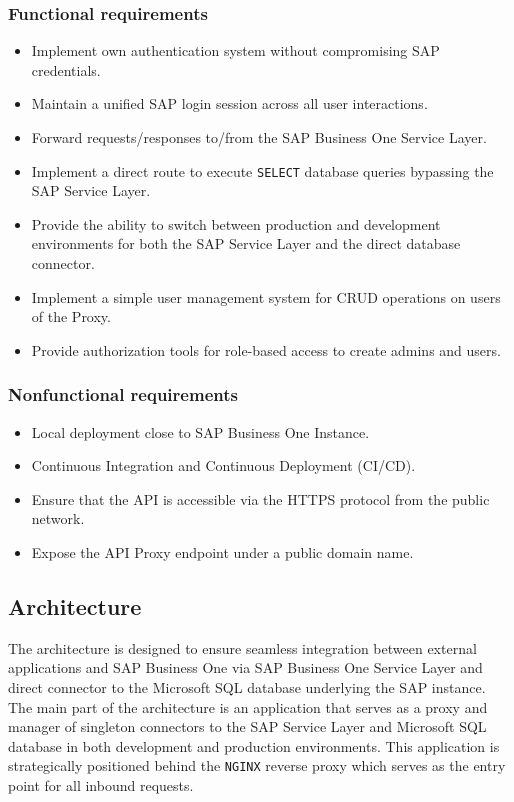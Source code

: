 \subsubsection{Functional requirements}
\label{subsubs:functional-requirements}
\begin{itemize}
    \item Implement own authentication system without compromising SAP credentials.
    \item Maintain a unified SAP login session across all user interactions.
    \item Forward requests/responses to/from the SAP Business One Service Layer.
    \item Implement a direct route to execute \texttt{SELECT} database queries bypassing the SAP Service Layer.
    \item Provide the ability to switch between production and development environments for both the SAP Service Layer and the direct database connector.
    \item Implement a simple user management system for CRUD operations on users of the Proxy.
    \item Provide authorization tools for role-based access to create admins and users.
\end{itemize}

\subsubsection{Nonfunctional requirements}
\label{subsubsec:nonfunctional-requirements}
\begin{itemize}
    \item Local deployment close to SAP Business One Instance.
    \item Continuous Integration and Continuous Deployment (CI/CD).
    \item Ensure that the API is accessible via the HTTPS protocol from the public network.
    \item Expose the API Proxy endpoint under a public domain name.
\end{itemize}

\subsection{Architecture}
\label{subsec:architecture}
The architecture is designed to ensure seamless integration between external applications and SAP Business One via SAP Business One Service Layer and direct connector to the Microsoft SQL database underlying the SAP instance. 
The main part of the architecture is an application that serves as a proxy and manager of singleton connectors to the SAP Service Layer and Microsoft SQL database in both development and production environments.
This application is strategically positioned behind the \texttt{NGINX} reverse proxy which serves as the entry point for all inbound requests.


